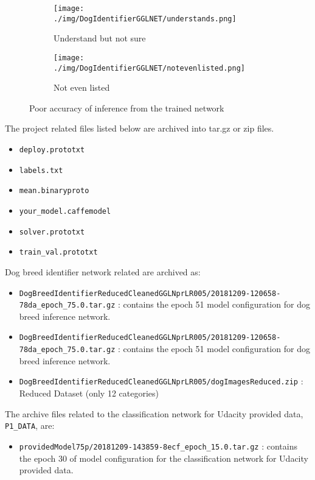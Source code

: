 \documentclass[10pt,journal,compsoc]{IEEEtran}
\begin{document}
\begin{figure}[thpb]
      \begin{subfigure}[b]{0.23\textwidth}
            \texttt{[image: ./img/DogIdentifierGGLNET/understands.png]}
            \caption{Understand but not sure}
            \label{fig:understand}
      \end{subfigure}%
      \begin{subfigure}[b]{0.23\textwidth}
              \texttt{[image: ./img/DogIdentifierGGLNET/notevenlisted.png]}
              \caption{Not even listed}
              \label{fig:notlisted}
      \end{subfigure} 
      
      \caption{Poor accuracy of inference from the trained network}\label{fig:Poor accuracy of inference from the trained network}
\end{figure}
 
The project related files listed below are archived into tar.gz or zip files.

\begin{itemize}
      \item \verb!deploy.prototxt!
      \item \verb!labels.txt!
      \item \verb!mean.binaryproto!
      \item \verb!your_model.caffemodel!
      \item \verb!solver.prototxt!
      \item \verb!train_val.prototxt!
\end{itemize}

Dog breed identifier network related are archived as:
\begin{itemize}
      \item \verb!DogBreedIdentifierReducedCleanedGGLNprLR005/20181209-120658-78da_epoch_75.0.tar.gz! : contains the epoch 51 model configuration for dog breed inference network.
      \item \verb!DogBreedIdentifierReducedCleanedGGLNprLR005/20181209-120658-78da_epoch_75.0.tar.gz! : contains the epoch 51 model configuration for dog breed inference network.
      \item \verb!DogBreedIdentifierReducedCleanedGGLNprLR005/dogImagesReduced.zip! : Reduced Dataset (only 12 categories)
\end{itemize}
The archive files related to the classification network for Udacity provided data, \verb!P1_DATA!, are:
\begin{itemize}
      \item \verb!providedModel75p/20181209-143859-8ecf_epoch_15.0.tar.gz! : contains the epoch 30 of model configuration for the classification network for Udacity provided data.
\end{itemize}
\end{document}
